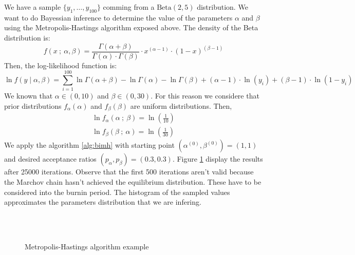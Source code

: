 \documentclass[11pt,fleqn]{book} %
\begin{document}
\begin{example}
	We have a sample $\{y_1,\dots,y_{100}\}$ comming from a $\text{Beta}(2,5)$ 
	distribution. We want to do Bayessian inference to determine the value of the 
	parameters $\alpha$ and $\beta$ using the Metropolis-Hastings algorithm exposed 
	above. The density of the Beta distribution is:
	\begin{displaymath}
		f(x\ ;\ \alpha, \beta) = 
		\frac{\Gamma(\alpha+\beta)}{\Gamma(\alpha) \cdot \Gamma(\beta)} 
		\cdot x^{(\alpha-1)} \cdot (1-x)^{(\beta-1)}
	\end{displaymath}
	Then, the log-likelihood function is:
	\begin{displaymath}
		\ln f(y \mid \alpha, \beta) = 
		\displaystyle \sum_{i=1}^{100} 
		\ln \Gamma(\alpha+\beta) - \ln \Gamma(\alpha) - \ln \Gamma(\beta) +
		(\alpha-1) \cdot \ln(y_i) + (\beta-1) \cdot \ln(1-y_i)
	\end{displaymath}
	We known that $\alpha \in (0,10)$ and $\beta \in (0,30)$. For this reason we 
	considere that prior distributions $f_{\alpha}(\alpha)$ and $f_{\beta}(\beta)$ 
	are uniform distributions. Then,
	\begin{displaymath}
		\begin{array}{l}
			\ln f_{\alpha}(\alpha \ ;\ \beta) = \ln(\frac{1}{10})
			\\
			\ln f_{\beta}(\beta \ ;\ \alpha) = \ln(\frac{1}{30})
		\end{array}
	\end{displaymath}
	We apply the algorithm \ref{alg:bimh} with starting point 
	$\left(\alpha^{(0)},\beta^{(0)}\right)=(1,1)$ and 
	desired acceptance ratios $(p_{\alpha},p_{\beta})=(0.3,0.3)$.
	Figure \ref{fig:mhbd} display the results after 25000 iterations.
	Observe that the first 500 iterations aren't valid because the Marchov 
	chain hasn't achieved the equilibrium distribution. These have to be 
	considered into the burnin period. The histogram of the sampled values
	approximates the parameters distribution that we are infering.
	\begin{figure}[!ht]
		\centering
		\\
		\\
		\caption{Metropolis-Hastings algorithm example}
		\label{fig:mhbd}
	\end{figure}
\end{example}
\end{document}
